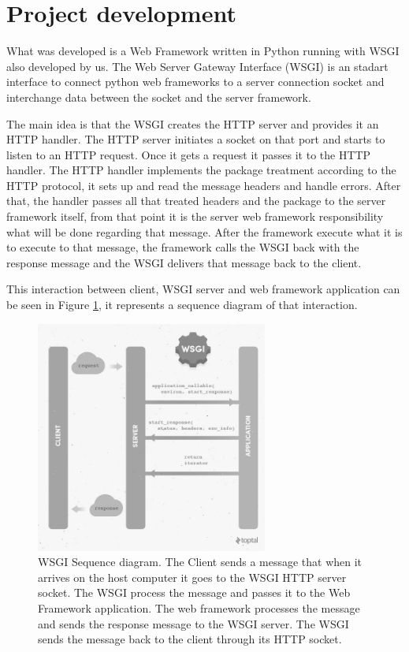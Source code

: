 \documentclass[journal,12pt,onecolumn,draftclsnofoot,]{IEEEtran}
\begin{document}
\section{Project development}
What was developed is a Web Framework written in Python running with WSGI also developed by us. The Web Server Gateway Interface (WSGI) is an stadart interface to connect python web frameworks to a server connection socket and interchange data between the socket and the server framework.

The main idea is that the WSGI creates the HTTP server and provides it an HTTP handler. The HTTP server initiates a socket on that port and starts to listen to an HTTP request. Once it gets a request it passes it to the HTTP handler. The HTTP handler implements the package treatment according to the HTTP protocol, it sets up and read the message headers and handle errors. After that, the handler passes all that treated headers and the package to the server framework itself, from that point it is the server web framework responsibility what will be done regarding that message. After the framework execute what it is to execute to that message, the framework calls the WSGI back with the response message and the WSGI delivers that message back to the client.

This interaction between client, WSGI server and web framework application can be seen in Figure \ref{fig_wsgi}, it represents a sequence diagram of that interaction.

\begin{figure}
  \begin{center}
  \includegraphics[width=3.0in]{./imgs/wsgi.jpg}
  \caption{WSGI Sequence diagram. The Client sends a message that when it arrives on the host computer it goes to the WSGI HTTP server socket. The WSGI process the message and passes it to the Web Framework application. The web framework processes the message and sends the response message to the WSGI server. The WSGI sends the message back to the client through its HTTP socket.}
  \label{fig_wsgi}
  \end{center}
\end{figure}
\end{document}

